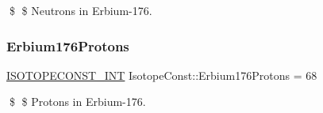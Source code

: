 \$ \$ Neutrons in Erbium-\/176. \mbox{\label{group___isotope_const-_erbium-_er176_ga44242a6df54109b0e366ae3eed149ad6}} 
\subsubsection{\texorpdfstring{Erbium176\+Protons}{Erbium176Protons}}
{\footnotesize\ttfamily \mbox{\hyperlink{group___isotope_const-_macros_ga5f18360b3e99483a35c32d789e62621c}{I\+S\+O\+T\+O\+P\+E\+C\+O\+N\+S\+T\+\_\+\+I\+NT}} Isotope\+Const\+::\+Erbium176\+Protons = 68}

\$ \$ Protons in Erbium-\/176. 